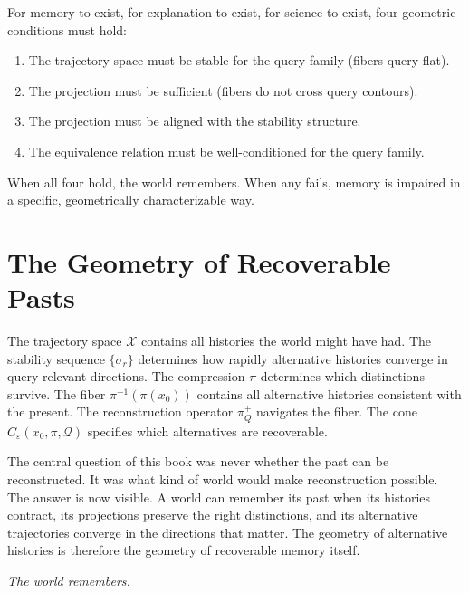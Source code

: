 For memory to exist, for explanation to exist, for science to exist, four geometric conditions must hold:
\begin{enumerate}
  \item The trajectory space must be stable for the query family (fibers query-flat).
  \item The projection must be sufficient (fibers do not cross query contours).
  \item The projection must be aligned with the stability structure.
  \item The equivalence relation must be well-conditioned for the query family.
\end{enumerate}

When all four hold, the world remembers. When any fails, memory is impaired in a specific, geometrically characterizable way.

\section{The Geometry of Recoverable Pasts}

The trajectory space $\mathcal{X}$ contains all histories the world might have had. The stability sequence $\{\sigma_r\}$ determines how rapidly alternative histories converge in query-relevant directions. The compression $\pi$ determines which distinctions survive. The fiber $\pi^{-1}(\pi(x_0))$ contains all alternative histories consistent with the present. The reconstruction operator $\pi^+_Q$ navigates the fiber. The cone $C_\varepsilon(x_0,\pi,\mathcal{Q})$ specifies which alternatives are recoverable.

The central question of this book was never whether the past can be reconstructed. It was what kind of world would make reconstruction possible. The answer is now visible. A world can remember its past when its histories contract, its projections preserve the right distinctions, and its alternative trajectories converge in the directions that matter. The geometry of alternative histories is therefore the geometry of recoverable memory itself.

\bigskip

\begin{center}\textit{The world remembers.}\end{center}
